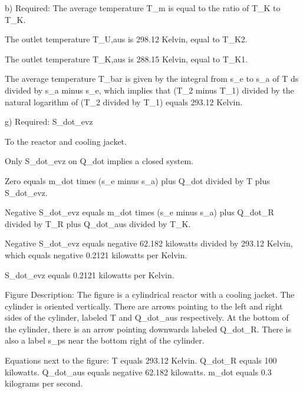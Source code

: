 b) Required:
The average temperature T_m is equal to the ratio of T_K to T_K.

The outlet temperature T_U,aus is 298.12 Kelvin, equal to T_K2.

The outlet temperature T_K,aus is 288.15 Kelvin, equal to T_K1.

The average temperature T_bar is given by the integral from s_e to s_a of T ds divided by s_a minus s_e, which implies that (T_2 minus T_1) divided by the natural logarithm of (T_2 divided by T_1) equals 293.12 Kelvin.

g) Required: S_dot_evz

To the reactor and cooling jacket.

Only S_dot_evz on Q_dot implies a closed system.

Zero equals m_dot times (s_e minus s_a) plus Q_dot divided by T plus S_dot_evz.

Negative S_dot_evz equals m_dot times (s_e minus s_a) plus Q_dot_R divided by T_R plus Q_dot_aus divided by T_K.

Negative S_dot_evz equals negative 62.182 kilowatts divided by 293.12 Kelvin, which equals negative 0.2121 kilowatts per Kelvin.

S_dot_evz equals 0.2121 kilowatts per Kelvin.

Figure Description: The figure is a cylindrical reactor with a cooling jacket. The cylinder is oriented vertically. There are arrows pointing to the left and right sides of the cylinder, labeled T and Q_dot_aus respectively. At the bottom of the cylinder, there is an arrow pointing downwards labeled Q_dot_R. There is also a label s_ps near the bottom right of the cylinder.

Equations next to the figure:
T equals 293.12 Kelvin.
Q_dot_R equals 100 kilowatts.
Q_dot_aus equals negative 62.182 kilowatts.
m_dot equals 0.3 kilograms per second.